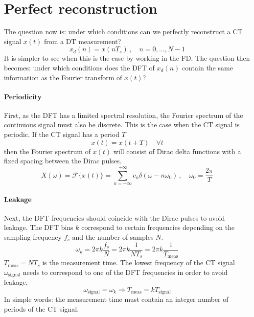 \newpage
\section{Perfect reconstruction}
The question now is: under which conditions can we perfectly reconstruct a CT signal $x(t)$ from a DT measurement?
\begin{equation*}
    x_d(n) = x(n T_s) \,,\quad n = 0,\ldots,N-1
\end{equation*}
It is simpler to see when this is the case by working in the FD. The question then becomes: under which conditions does the DFT of $x_d(n)$ contain the same information as the Fourier transform of $x(t)$?

\paragraph{Periodicity}
First, as the DFT has a limited spectral resolution, the Fourier spectrum of the continuous signal must also be discrete. This is the case when the CT signal is periodic. If the CT signal has a period $T$
\begin{equation*}
    x(t) = x(t+T) \quad \forall t
\end{equation*}
then the Fourier spectrum of $x(t)$ will consist of Dirac delta functions with a fixed spacing between the Dirac pulses.
\begin{equation*}
    X(\omega) = \mathcal{F}\{x(t)\} = \sum_{n=-\infty}^{+\infty} c_n \delta(\omega - n \omega_0) \,,\quad \omega_0 = \frac{2\pi}{T}
\end{equation*}

\paragraph{Leakage}
Next, the DFT frequencies should coincide with the Dirac pulses to avoid leakage. The DFT bins $k$ correspond to certain frequencies depending on the sampling frequency $f_s$ and the number of samples $N$.
\begin{equation*}
    \omega_k = 2 \pi k \frac{f_s}{N} = 2 \pi k \frac{1}{N T_s} = 2 \pi k \frac{1}{T_{\mathrm{meas}}}
\end{equation*}
$T_{\mathrm{meas}} = N T_s$ is the measurement time. The lowest frequency of the CT signal $\omega_{\mathrm{signal}}$ needs to correspond to one of the DFT frequencies in order to avoid leakage.
\begin{equation*}
    \omega_{\mathrm{signal}} = \omega_k \Rightarrow \boxed{T_{\mathrm{meas}} = k T_{\mathrm{signal}}}
\end{equation*}
In simple words: the measurement time must contain an integer number of periods of the CT signal.

